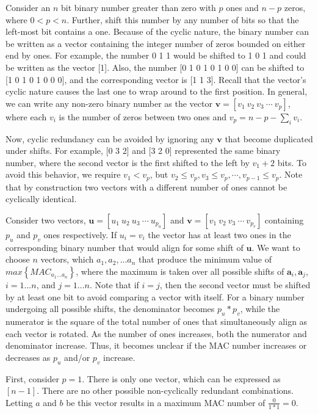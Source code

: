 \documentclass[3p,times]{elsarticle}
\begin{document}
Consider an $n$ bit binary number greater than zero with $p$ ones and $n-p$ zeros, where $0<p<n$.  Further, shift this number by any number of bits so that the left-most bit contains a one.  
Because of the cyclic nature, the binary number can be written as a vector containing the integer number of zeros bounded on either end by ones.  For example, the number 0 1 1 would be shifted to 1 0 1 and could be written as the vector [1].  Also, the number [0 1 0 1 0 1 0 0] can be shifted to [1 0 1 0 1 0 0 0], and the corresponding vector is [1 1 3].  Recall that the vector's cyclic nature causes the last one to wrap around to the first 
position.  In general, we can write any non-zero binary number as the vector $\textbf{v}=\left[v_1\ v_2\ v_3\ \cdots\ v_p\right]$, where each $v_i$ is the number of zeros between two ones and $v_p=n-p-\sum\limits_{i} v_i$.  

Now, cyclic redundancy can be avoided by ignoring any $\textbf{v}$ that become duplicated under shifts.  For example, [0 3 2] and [3 2 0] represented the same binary number, where the second vector is the first shifted to the left by $v_1+2$ bits.  To avoid this behavior, we require $v_{1}<v_p$, but $v_2\le v_p, v_3\le v_p, \cdots, v_{p-1}\le v_p$.  Note that by construction two vectors with a different number of ones cannot be cyclically identical.

Consider two vectors, $\textbf{u}=\left[u_1\ u_2\ u_3\ \cdots\ u_{p_u}\right]$ and $\textbf{v}=\left[v_1\ v_2\ v_3\ \cdots\ v_{p_v}\right]$ containing $p_u$ and $p_v$ ones respectively.  If $u_i=v_i$ the vector has at least two ones in the corresponding binary number that would align for some shift of $\textbf{u}$.  
We want to choose $n$ vectors, which $a_1, a_2, ... a_n$ that produce the minimum value of $max\left\{MAC_{a_1...a_n}\right\}$, where the maximum is taken over all possible shifts of $\textbf{a}_i, \textbf{a}_j$, $i=1...n$, and $j=1...n$.  Note that if $i=j$, then the second vector must be shifted by at least one bit to avoid comparing a vector with itself.  For a binary number undergoing all possible shifts, the denominator becomes $p_u * p_v$, while the 
numerator is the square of the total number of ones that simultaneously align as each vector is rotated.  As the number of ones increases, both the numerator and denominator increase.   
Thus, it becomes unclear if the MAC number increases or decreases as $p_u$ and/or $p_v$ increase.

First, consider $p=1$.  There is only one vector, which can be expressed as $\left[n-1\right]$.  There are no other possible non-cyclically redundant combinations.  Letting $a$ and $b$ be this vector results in a maximum MAC number of $\frac{0}{1*1}=0$.
\end{document}

